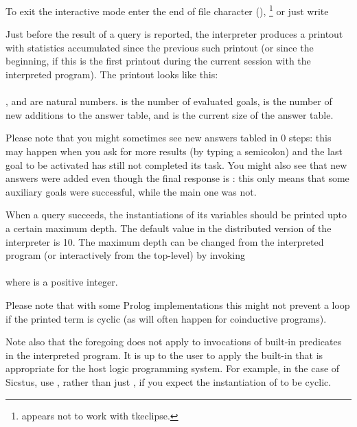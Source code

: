 To exit the interactive mode enter the end of file character
(),%
\footnote{
   appears not to work with tkeclipse.}
or just write\\
\ind{}


%

Just before the result of a query is reported, the interpreter produces a
printout with statistics accumulated since the previous
such printout (or since the beginning, if this is the first printout during
the current session with the interpreted program). The printout looks like
this:\\
\ind{}\\
, and  are natural numbers.  is the number of
evaluated goals,  is the number of new additions to the answer table,
and  is the current size of the answer table.

Please note that you might sometimes see new answers tabled in 0 steps: this
may happen when you ask for more results (by typing a semicolon) and the last
goal to be activated has still not completed its task.  You might also see
that new answers were added even though the final response is : this
only means that some auxiliary goals were successful, while the main one was
not.


%

When a query succeeds, the instantiations of its variables should be printed
upto a certain maximum depth.  The default value in the distributed version
of the interpreter is 10.  The maximum depth can be changed from the
interpreted program (or interactively from the top-level) by invoking\\
\ind{}\\
where  is a positive integer.

Please note that with some Prolog implementations this might not prevent a
loop if the printed term is cyclic (as will often happen for coinductive
programs).

Note also that the foregoing does not apply to invocations of built-in
predicates in the interpreted program.  It is up to the user to apply the
built-in that is appropriate for the host logic programming system.  For
example, in the case of Sicstus, use
, rather than just , if you expect the instantiation of  to be cyclic.



